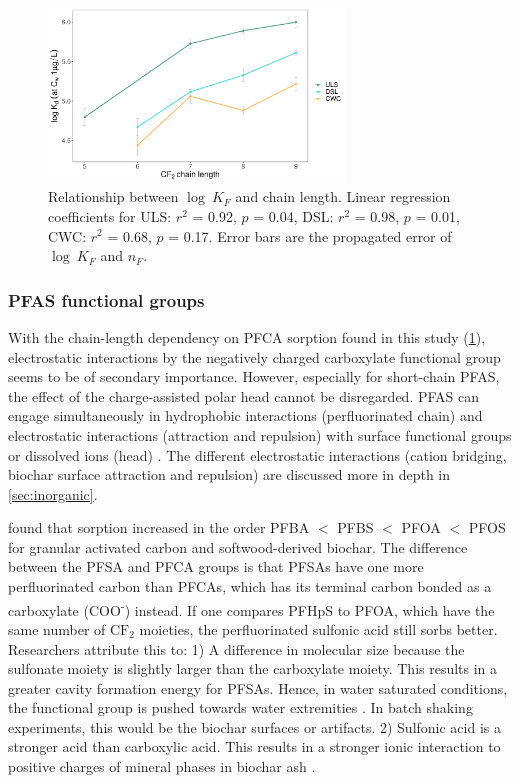 \begin{figure}[tbh]
    \centering
    \includegraphics[width=0.7\textwidth]{R/figs/chain_length_Kd1ugL_plot.pdf}
    \caption{Relationship between $\log~K_F$ and chain length. Linear regression coefficients for ULS: $r^2$ = 0.92, $p$ = 0.04, DSL: $r^2$ = 0.98, $p$ = 0.01, CWC: $r^2$ = 0.68, $p$ = 0.17. Error bars are the propagated error of $\log~K_F$ and $n_F$.}
    \label{fig:chainlength}
\end{figure}

\subsubsection{PFAS functional groups} 
With the chain-length dependency on PFCA sorption found in this study (\cref{fig:chainlength}), electrostatic interactions by the negatively charged carboxylate functional group seems to be of secondary importance. However, especially for short-chain PFAS, the effect of the charge-assisted polar head cannot be disregarded. PFAS can engage simultaneously in hydrophobic interactions (perfluorinated chain) and electrostatic interactions (attraction and repulsion) with surface functional groups or dissolved ions (head) \citep{zhang2013sorption,sigmund2022sorption}. The different electrostatic interactions (cation bridging, biochar surface attraction and repulsion) are discussed more in depth in \cref{sec:inorganic}.

\cite{zhang2021sorption} found that sorption increased in the order PFBA $<$ PFBS $<$ PFOA $<$ PFOS for granular activated carbon and softwood-derived biochar. The difference between the PFSA and PFCA groups is that PFSAs have one more perfluorinated carbon than PFCAs, which has its terminal carbon bonded as a carboxylate (COO\textsuperscript{-}) instead. If one compares PFHpS to PFOA, which have the same number of $\mathrm{CF_2}$ moieties, the perfluorinated sulfonic acid still sorbs better. Researchers attribute this to: 1) A difference in molecular size because the sulfonate moiety is slightly larger than the carboxylate moiety. This results in a greater cavity formation energy for PFSAs. Hence, in water saturated conditions, the functional group is pushed towards water extremities \citep{yin2022insights,sigmund2022sorption}. In batch shaking experiments, this would be the biochar surfaces or artifacts. 2) Sulfonic acid is a stronger acid than carboxylic acid. This results in a stronger ionic interaction to positive charges of mineral phases in biochar ash \citep{arvaniti2015review}. 

